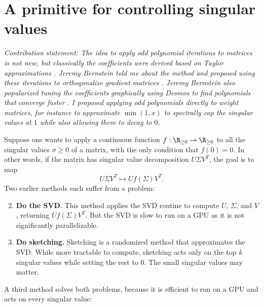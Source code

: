 \section{A primitive for controlling singular values}
\label{subsec:a-primitive-for-controlling-singular-values}

\textit{Contribution statement: The idea to apply odd polynomial iterations to matrices is not new, but classically the coefficients were derived based on Taylor approximations \citep{kovarik1970iterative,bjoerck1971,higham}. Jeremy Bernstein told me about the method and proposed using these iterations to orthogonalize gradient matrices \citep{bernstein2024anthology}. Jeremy Bernstein also popularized tuning the coefficients graphically using Desmos to find polynomials that converge faster \citep{modula-docs}. I proposed applying odd polynomials directly to weight matrices, for instance to approximate $\min(1, x)$ to spectrally cap the singular values at $1$ while also allowing them to decay to $0$.}

\vspace{0.5em}

Suppose one wants to apply a continuous function $f : \R_{\geq0} \to \R_{\geq0}$ to all the singular values $\sigma \geq 0$ of a matrix, with the only condition that $f(0) = 0$. In other words, if the matrix has singular value decomposition $U \Sigma V^T$, the goal is to map \begin{equation}
    U \Sigma V^T \mapsto U f(\Sigma) V^T.
\end{equation} Two earlier methods each suffer from a problem:

\begin{enumerate}
    \setcounter{enumi}{1}
    \item \textbf{Do the SVD}. This method applies the SVD routine to compute $U$, $\Sigma$, and $V$, returning $Uf(\Sigma)V^T$. But the SVD is slow to run on a GPU as it is not significantly parallelizable.
    \item \textbf{Do sketching.} Sketching is a randomized method \citep{Martinsson_Tropp_2020} that approximates the SVD. While more tractable to compute, sketching acts only on the top $k$ singular values while setting the rest to $0$. The small singular values may matter.
\end{enumerate}

A third method solves both problems, because it is efficient to run on a GPU and acts on every singular value:

